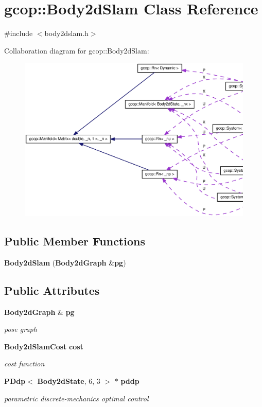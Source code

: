 \section{gcop\-:\-:\-Body2d\-Slam \-Class \-Reference}
\label{classgcop_1_1Body2dSlam}


{\ttfamily \#include $<$body2dslam.\-h$>$}



\-Collaboration diagram for gcop\-:\-:\-Body2d\-Slam\-:
\nopagebreak
\begin{figure}[H]
\begin{center}
\leavevmode
\includegraphics[width=350pt]{classgcop_1_1Body2dSlam__coll__graph}
\end{center}
\end{figure}
\subsection*{\-Public \-Member \-Functions}
\begin{DoxyCompactItemize}
\item 
{\bf \-Body2d\-Slam} ({\bf \-Body2d\-Graph} \&{\bf pg})
\end{DoxyCompactItemize}
\subsection*{\-Public \-Attributes}
\begin{DoxyCompactItemize}
\item 
{\bf \-Body2d\-Graph} \& {\bf pg}
\begin{DoxyCompactList}\small\item\em pose graph \end{DoxyCompactList}\item 
{\bf \-Body2d\-Slam\-Cost} {\bf cost}
\begin{DoxyCompactList}\small\item\em cost function \end{DoxyCompactList}\item 
{\bf \-P\-Ddp}$<$ {\bf \-Body2d\-State}, 6, 3 $>$ $\ast$ {\bf pddp}
\begin{DoxyCompactList}\small\item\em parametric discrete-\/mechanics optimal control \end{DoxyCompactList}\end{DoxyCompactItemize}



